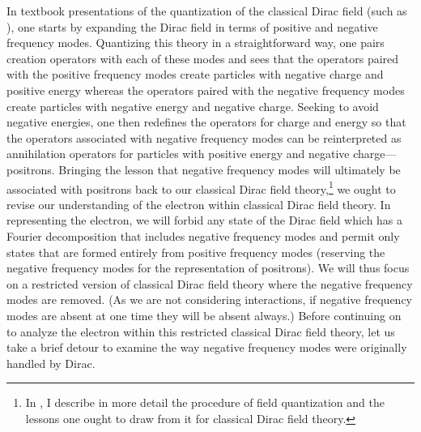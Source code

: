 \documentclass[onecolumn,secnumarabic,amsmath,amssymb,balancelastpage,nofootinbib]{article}
\begin{document}
In textbook presentations of the quantization of the classical Dirac field (such as \citealp[section 3.5]{peskinschroeder}), one starts by expanding the Dirac field in terms of positive and negative frequency modes.  Quantizing this theory in a straightforward way, one pairs creation operators with each of these modes and sees that the operators paired with the positive frequency modes create particles with negative charge and positive energy whereas the operators paired with the negative frequency modes create particles with negative energy and negative charge.  Seeking to avoid negative energies, one then redefines the operators for charge and energy so that the operators associated with negative frequency modes can be reinterpreted as annihilation operators for particles with positive energy and negative charge---positrons.  Bringing the lesson that negative frequency modes will ultimately be associated with positrons back to our classical Dirac field theory,\footnote{In \citet{positronpaper}, I describe in more detail the procedure of field quantization and the lessons one ought to draw from it for classical Dirac field theory.} we ought to revise our understanding of the electron within classical Dirac field theory.  In representing the electron, we will forbid any state of the Dirac field which has a Fourier decomposition that includes negative frequency modes and permit only states that are formed entirely from positive frequency modes (reserving the negative frequency modes for the representation of positrons).  We will thus focus on a restricted version of classical Dirac field theory where the negative frequency modes are removed.  (As we are not considering interactions, if negative frequency modes are absent at one time they will be absent always.)  Before continuing on to analyze the electron within this restricted classical Dirac field theory, let us take a brief detour to examine the way negative frequency modes were originally handled by Dirac.
\end{document}
